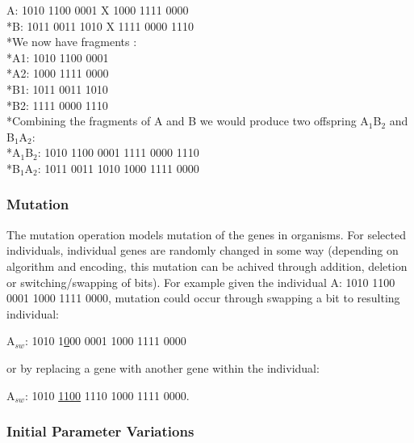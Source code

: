 \begin{center}
A: 1010 1100 0001 X 1000 1111 0000
\\*B: 1011 0011 1010 X 1111 0000 1110
\vspace{2 mm}
\\*We now have fragments : 
\\*A1: 1010 1100 0001 
\\*A2: 1000 1111 0000
\\*B1: 1011 0011 1010 
\\*B2: 1111 0000 1110
\vspace{2 mm}
\\*Combining the fragments of A and B we would produce two offspring A\(_{1}\)B\(_{2}\) and B\(_{1}\)A\(_{2}\):
\vspace{2 mm}
\\*A\(_{1}\)B\(_{2}\): 1010 1100 0001 1111 0000 1110
\\*B\(_{1}\)A\(_{2}\): 1011 0011 1010 1000 1111 0000
\end{center}

\subsubsection{Mutation}
The mutation operation models mutation of the genes in organisms. For selected individuals, individual genes are randomly 
changed in some way (depending on algorithm and encoding, this mutation can be achived through addition, deletion or switching/swapping of bits).
For example given the individual A:  1010 1100 0001 1000 1111 0000, mutation could occur through swapping a bit to resulting 
individual: 
\begin{center} A\(_{sw}\):   1010 1\underline{0}00 0001 1000 1111 0000 \end{center}
or by replacing a gene with another gene within the individual:
\begin{center} A\(_{sw}\):   1010 \underline{1100} 1110 1000 1111 0000.\end{center}
                                                           
\subsubsection{Initial Parameter Variations}

